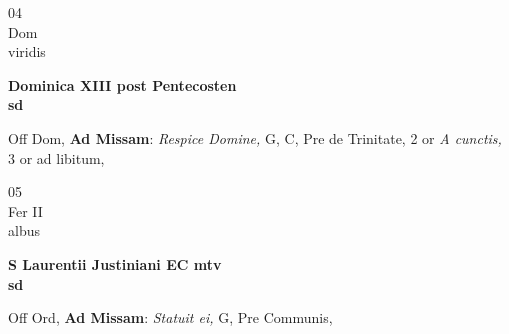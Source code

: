 \documentclass[10pt, openany]{book}
\begin{document}
        \begin{center}
            \begin{minipage}{3.5in}
                \vspace{2em}
                \begin{minipage}{0.5in}
                    {\Huge 04} \\
                    {\normalsize Dom} \\
                    {\normalsize viridis}
                \end{minipage}
                \begin{minipage}{3.0in}
                    \textbf{ \large Dominica XIII post Pentecosten \\
                    \textnormal{\normalsize sd}} \\ 
                \end{minipage}
                \begin{justify}Off Dom, \textbf{Ad Missam}: \textit{Respice Domine,} G, C, Pre de Trinitate, 2 or \textit{A cunctis,} 3 or ad libitum,  
                \end{justify}
            \end{minipage}
        \end{center}
    
        \begin{center}
            \begin{minipage}{3.5in}
                \vspace{2em}
                \begin{minipage}{0.5in}
                    {\Huge 05} \\
                    {\normalsize Fer II} \\
                    {\normalsize albus}
                \end{minipage}
                \begin{minipage}{3.0in}
                    \textbf{ \large S Laurentii Justiniani EC mtv \\
                    \textnormal{\normalsize sd}} \\ 
                \end{minipage}
                \begin{justify}Off Ord, \textbf{Ad Missam}: \textit{Statuit ei,} G, Pre Communis,  
                \end{justify}
            \end{minipage}
        \end{center}
    
\end{document}
